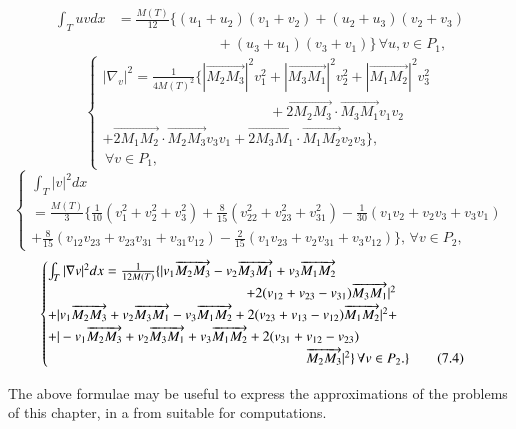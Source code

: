 \begin{align*}
\int_T uv dx & = \frac{M (T)} {12} \{ (u_1 + u_2) (v_1 +v_2) + (u_2 +
  u_3) (v_2 + v_3)\\ 
  &\hspace{3cm} + (u_3 + u_1) (v_3 + v_1)\} \, \forall  u, v
  \in P_1 , \tag{7.1}\label{c2:eq7.1}
\end{align*}
\begin{equation*}
 \begin{cases}
|\nabla_v|^2 = \frac{1}{4M (T)^2} \{ |\overrightarrow {M_2
  M_3}|^2 v^2_1 + |\overrightarrow{M_3 M_1}|^2 v_2^2 +
|\overrightarrow{M_1 M_2}|^2 v^2_3\\ 
\hspace{5cm}+ \overrightarrow{2 M_2 M_3} \cdot
\overrightarrow{M_3 M_1} v_1 v_2  \\ 
+ \overrightarrow{2M_1 M_2} \cdot \overrightarrow{M_2M_3} v_3v_1 +
\overrightarrow{2M_3M_1} \cdot \overrightarrow{M_1M_2} v_2 v_3\} ,\\ 
\, \forall  v \in P_1, 
\end{cases}\tag{7.2}\label{c2:eq7.2}
\end{equation*}
{\fontsize{10}{12}\selectfont
\begin{equation*}
 \begin{cases}
\int_T |v|^2 dx\\ 
= \frac{M (T)}{3} \{ \frac{1}{10} (v^2_1 + v_2^2 +
v_3^2) + \frac{8}{15} (v_{22}^2 + v^2_{23} +v_{31}^2) - \frac{1}{30}
(v_1 v_2 + v_2 v_3 + v_3 v_1)  \\ 
 + \frac{8}{15} (v_{12} v_{23} + v_{23} v_{31} + v_{31} v_{12}) -
\frac{2}{15} (v_1 v_{23} + v_2 v_{31} + v_3 v_{12})\} , \, \forall 
v \in P_2, \tag{7.3}\label{c2:eq7.3} 
\end{cases}
\end{equation*}}
\begin{equation*}
 \begin{cases}
   \int_T |\nabla v|^2 dx = \frac {1} {12 M (T)} \{ |v_1
   \overrightarrow { M_2 M_3} - v_2\overrightarrow{M_3 M_1} + v_3
   \overrightarrow{M_1 M_2}\\ 
   \hspace{5cm}+ 2 (v_{12} + v_{23} - v_{31})
   \overrightarrow {M_3M_1}|^2  \\ 
    + |v_1 \overrightarrow{M_2 M_3} + v_2 \overrightarrow{M_3 M_1} -
   v_3 \overrightarrow {M_1M_2} + 2 (v_{23} + v_{13} - v_{12})
   \overrightarrow {M_1 M_2} |^2 +\\ 
    + |-v_1 \overrightarrow{M_2 M_3} + v_2 \overrightarrow{M_3 M_1} +
   v_3 \overrightarrow {M_1 M_2} + 2 (v_{31} + v_{12} - v_{23})\\
   \hspace{6.5cm}\overrightarrow {M_2 M_3} |^2\} \, \forall  v \in P_2.\}
   \tag{7.4}\label{c2:eq7.4}
\end{cases}
\end{equation*}\pageoriginale 

The above formulae may be useful to express the approximations of the
problems of this chapter, in a from suitable for computations. 
